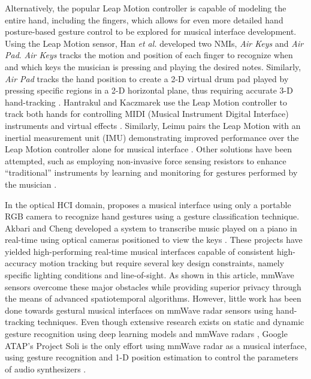 \documentclass[10pt,journal,final]{IEEEtran}
\begin{document}
Alternatively, the popular Leap Motion controller is capable of modeling the entire hand, including the fingers, which allows for even more detailed hand posture-based gesture control to be explored for musical interface development. 
Using the Leap Motion sensor, Han \textit{et al.} developed two NMIs, \textit{Air Keys} and \textit{Air Pad}. 
\textit{Air Keys} tracks the motion and position of each finger to recognize when and which keys the musician is pressing and playing the desired notes. 
Similarly, \textit{Air Pad} tracks the hand position to create a 2-D virtual drum pad played by pressing specific regions in a 2-D horizontal plane, thus requiring accurate 3-D hand-tracking \cite{han2014lessons}. 
Hantrakul and Kaczmarek use the Leap Motion controller to track both hands for controlling MIDI (Musical Instrument Digital Interface) instruments and virtual effects \cite{hantrakul2014implementations}. 
Similarly, Leimu pairs the Leap Motion with an inertial measurement unit (IMU) demonstrating improved performance over the Leap Motion controller alone for musical interface \cite{brown2016leimu}. 
Other solutions have been attempted, such as employing non-invasive force sensing resistors to enhance ``traditional'' instruments by learning and monitoring for gestures performed by the musician \cite{ieeetm:training_surrogate_sensors}. 

In the optical HCI domain, \cite{intro:RGBcamera} proposes a musical interface using only a portable RGB camera to recognize hand gestures using a gesture classification technique. 
Akbari and Cheng developed a system to transcribe music played on a piano in real-time using optical cameras positioned to view the keys \cite{ieeetm:real_time_piano_music_transcription}. 
These projects have yielded high-performing real-time musical interfaces capable of consistent high-accuracy motion tracking but require several key design constraints, namely specific lighting conditions and line-of-sight. 
As shown in this article, mmWave sensors overcome these major obstacles while providing superior privacy through the means of advanced spatiotemporal algorithms.
However, little work has been done towards gestural musical interfaces on mmWave radar sensors using hand-tracking techniques. 
Even though extensive research exists on static and dynamic gesture recognition using deep learning models and mmWave radars \cite{gurbuz2021american,sang2018micro,kim2016hand,josiah:hand_gesture_recognition}, Google ATAP's Project Soli is the only effort using mmWave radar as a musical interface, using gesture recognition and 1-D position estimation to control the parameters of audio synthesizers \cite{intro:soli_musical_instrument}. 
\end{document}
